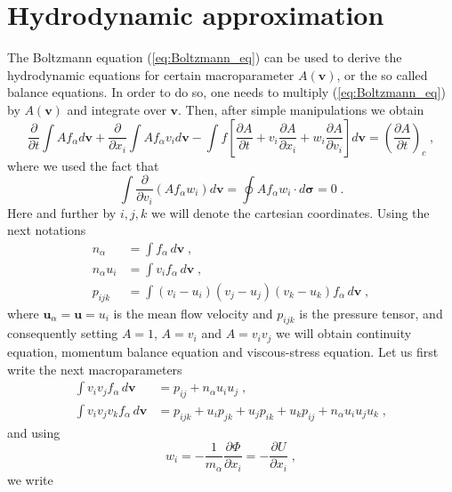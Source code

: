 \documentclass[preprint, aps, pra]{revtex4-1}
\newcommand{\bv}{{\bm{v}}}
\newcommand{\bu}{{\bm{u}}}
\newcommand{\pd}{\partial}
\begin{document}
\section{Hydrodynamic approximation}
The Boltzmann equation (\ref{eq:Boltzmann_eq}) can be used to derive the hydrodynamic equations for certain macroparameter $A(\bv)$,
or the so called balance equations. In order to do so, one needs to multiply (\ref{eq:Boltzmann_eq}) by $A(\bv)$ and integrate
over $\bv$. Then, after simple manipulations we obtain 
\begin{equation}
  \frac{\pd}{\pd t}\int Af_\alpha d\bv + \frac{\pd}{\pd x_i}\int Af_\alpha v_i d\bv
  -\int f\left[\frac{\pd A}{\pd t}+v_i\frac{\pd A}{\pd x_i}+w_i\frac{\pd A}{\pd v_i}\right]d\bv=\left(\frac{\pd A}{\pd t}\right)_c\;,
\end{equation}
where we used the fact that 
\begin{equation}
  \int\frac{\pd}{\pd v_i}(Af_\alpha w_i)d\bv=\oint Af_\alpha w_i\cdot d{\bm{\sigma}} = 0\;.
\end{equation}
Here and further by $i,j,k$ we will denote the cartesian coordinates. Using the next notations
\begin{equation}
  \begin{split}
    n_\alpha &= \int f_\alpha\,d\bv\;,\\
    n_\alpha u_i &= \int v_i f_\alpha\,d\bv\;,\\
    p_{ijk} &= \int (v_i-u_i)(v_j-u_j)(v_k-u_k)f_\alpha\,d\bv\;,
  \end{split}
\end{equation}
where $\bu_\alpha=\bu=u_i$ is the mean flow velocity and $p_{ijk}$ is the pressure tensor, and consequently setting $A=1$, $A=v_i$ and $A=v_iv_j$
we will obtain continuity equation, momentum balance equation and viscous-stress equation. Let us first write the next macroparameters
\begin{equation}
  \begin{split}
    \int v_iv_j f_\alpha\,d\bv &= p_{ij}+n_\alpha u_iu_j\;,\\
    \int v_iv_jv_k f_\alpha\,d\bv &= p_{ijk} + u_ip_{jk} + u_jp_{ik} + u_kp_{ij} + n_\alpha u_iu_ju_k\;,
  \end{split}
\end{equation}
and using 
\begin{equation}
  w_i = -\frac{1}{m_\alpha}\frac{\pd\Phi}{\pd x_i}=-\frac{\pd U}{\pd x_i}\;,
\end{equation}
we write
\end{document}
